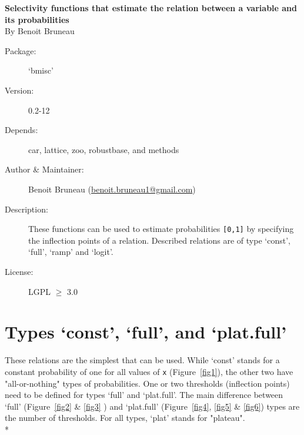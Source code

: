 \documentclass[letterpaper, 12pt]{article}
\begin{document}
\begin{titlepage}
\vspace*{3cm}
\begin{center}

\huge{\bf Selectivity functions that estimate the relation between a variable and its probabilities}\\

\vspace*{2cm}
\large{By Benoit Bruneau}
\end{center}
\vspace*{4cm}

\begin{description}
\item[Package:] `bmisc'
\item[Version:] 0.2-12
\item[Depends:] car, lattice, zoo, robustbase, and methods
\item[Author \& Maintainer:] Benoit Bruneau (\href{mailto:benoit.bruneau1@gmail.com}{benoit.bruneau1@gmail.com})
\item[Description:] These functions can be used to estimate probabilities \verb=[0,1]= by specifying the inflection points of a relation. Described relations are of type `const', `full', `ramp' and `logit'.
\item[License:] LGPL $\geqslant$ 3.0
\end{description}


\vspace*{\fill}


\end{titlepage}

\tableofcontents
\newpage

\section{Types `const', `full', and `plat.full'}
\noindent These relations are the simplest that can be used. While `const' stands for a constant probability of one for all 
values of \verb#x# (Figure~\ref{fig1}), the other two have "all-or-nothing" types of probabilities. One or two thresholds 
(inflection points) need to be defined for types `full' and `plat.full'. The main difference between `full'
(Figure~\ref{fig2} \& \ref{fig3} ) 
and `plat.full' (Figure~\ref{fig4}, \ref{fig5} \& \ref{fig6}) types are the number of thresholds. For all types, `plat' stands for "plateau".\\*
\end{document}
